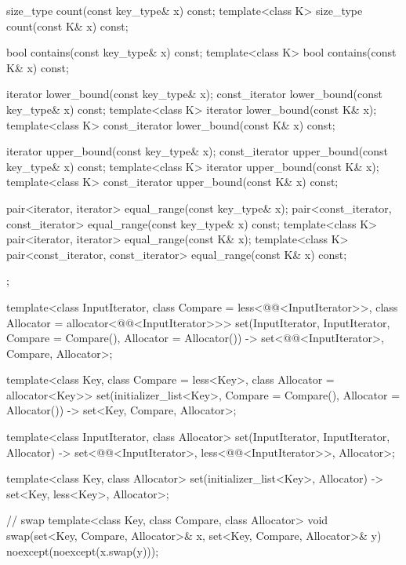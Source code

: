 \begin{codeblock}
{{    size_type      count(const key_type& x) const;
    template<class K> size_type count(const K& x) const;

    bool           contains(const key_type& x) const;
    template<class K> bool contains(const K& x) const;

    iterator       lower_bound(const key_type& x);
    const_iterator lower_bound(const key_type& x) const;
    template<class K> iterator       lower_bound(const K& x);
    template<class K> const_iterator lower_bound(const K& x) const;

    iterator       upper_bound(const key_type& x);
    const_iterator upper_bound(const key_type& x) const;
    template<class K> iterator       upper_bound(const K& x);
    template<class K> const_iterator upper_bound(const K& x) const;

    pair<iterator, iterator>               equal_range(const key_type& x);
    pair<const_iterator, const_iterator>   equal_range(const key_type& x) const;
    template<class K>
      pair<iterator, iterator>             equal_range(const K& x);
    template<class K>
      pair<const_iterator, const_iterator> equal_range(const K& x) const;
  };

  template<class InputIterator,
           class Compare = less<@@<InputIterator>>,
           class Allocator = allocator<@@<InputIterator>>>
    set(InputIterator, InputIterator,
        Compare = Compare(), Allocator = Allocator())
      -> set<@@<InputIterator>, Compare, Allocator>;

  template<class Key, class Compare = less<Key>, class Allocator = allocator<Key>>
    set(initializer_list<Key>, Compare = Compare(), Allocator = Allocator())
      -> set<Key, Compare, Allocator>;

  template<class InputIterator, class Allocator>
    set(InputIterator, InputIterator, Allocator)
      -> set<@@<InputIterator>,
             less<@@<InputIterator>>, Allocator>;

  template<class Key, class Allocator>
    set(initializer_list<Key>, Allocator) -> set<Key, less<Key>, Allocator>;

  // swap
  template<class Key, class Compare, class Allocator>
    void swap(set<Key, Compare, Allocator>& x,
              set<Key, Compare, Allocator>& y)
      noexcept(noexcept(x.swap(y)));
}
\end{codeblock}%
%

